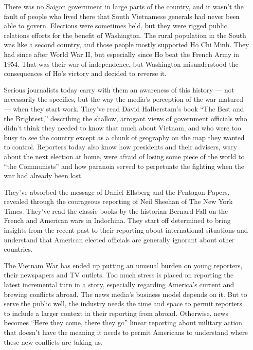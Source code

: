 There was no Saigon government in large parts of the country, and it
wasn't the fault of people who lived there that South Vietnamese
generals had never been able to govern. Elections were sometimes held,
but they were rigged public relations efforts for the benefit of
Washington. The rural population in the South was like a second country,
and those people mostly supported Ho Chi Minh. They had since after
World War II, but especially since Ho beat the French Army in 1954. That
was their war of independence, but Washington misunderstood the
consequences of Ho's victory and decided to reverse it.

Serious journalists today carry with them an awareness of this history
--- not necessarily the specifics, but the way the media's perception of
the war matured --- when they start work. They've read David
Halberstam's book ``The Best and the Brightest,'' describing the
shallow, arrogant views of government officials who didn't think they
needed to know that much about Vietnam, and who were too busy to see the
country except as a chunk of geography on the map they wanted to
control. Reporters today also know how presidents and their advisers,
wary about the next election at home, were afraid of losing some piece
of the world to ``the Communists'' and how paranoia served to perpetuate
the fighting when the war had already been lost.

They've absorbed the message of Daniel Ellsberg and the Pentagon Papers,
revealed through the courageous reporting of Neil Sheehan of The New
York Times. They've read the classic books by the historian Bernard Fall
on the French and American wars in Indochina. They start off determined
to bring insights from the recent past to their reporting about
international situations and understand that American elected officials
are generally ignorant about other countries.

The Vietnam War has ended up putting an unusual burden on young
reporters, their newspapers and TV outlets. Too much stress is placed on
reporting the latest incremental turn in a story, especially regarding
America's current and brewing conflicts abroad. The news media's
business model depends on it. But to serve the public well, the industry
needs the time and space to permit reporters to include a larger context
in their reporting from abroad. Otherwise, news becomes ``Here they
come, there they go'' linear reporting about military action that
doesn't have the meaning it needs to permit Americans to understand
where these new conflicts are taking us.

